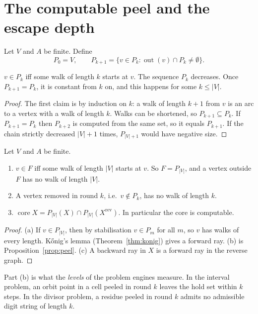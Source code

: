 \section{The computable peel and the escape depth}

Let \(V\) and \(A\) be finite. Define
\[
  P_0=V,\qquad P_{k+1}=\{v\in P_k : \operatorname{out}(v)\cap P_k\neq\emptyset\}.
\]

\begin{proposition}\label{prop:peel}
\(v\in P_k\) iff some walk of length \(k\) starts at \(v\). The sequence \(P_k\) decreases.
Once \(P_{k+1}=P_k\), it is constant from \(k\) on, and this happens for some \(k\le|V|\).
\end{proposition}

\begin{proof}
The first claim is by induction on \(k\): a walk of length \(k+1\) from \(v\) is an arc to a
vertex with a walk of length \(k\). Walks can be shortened, so \(P_{k+1}\subseteq P_k\). If
\(P_{k+1}=P_k\) then \(P_{k+2}\) is computed from the same set, so it equals \(P_{k+1}\). If the
chain strictly decreased \(|V|+1\) times, \(P_{|V|+1}\) would have negative size.
\end{proof}

\begin{theorem}\label{thm:escape}
Let \(V\) and \(A\) be finite.
\begin{enumerate}[label=(\alph*)]
\item \(v\in F\) iff some walk of length \(|V|\) starts at \(v\). So \(F=P_{|V|}\), and a vertex
  outside \(F\) has no walk of length \(|V|\).
\item A vertex removed in round \(k\), i.e.\ \(v\notin P_k\), has no walk of length \(k\).
\item \(\operatorname{core}X=P_{|V|}(X)\cap P_{|V|}(X^{\mathrm{rev}})\). In particular the core
  is computable.
\end{enumerate}
\end{theorem}

\begin{proof}
(a) If \(v\in P_{|V|}\), then by stabilisation \(v\in P_m\) for all \(m\), so \(v\) has walks
of every length. Kőnig's lemma (Theorem~\ref{thm:konig}) gives a forward ray. (b) is
Proposition~\ref{prop:peel}. (c) A backward ray in \(X\) is a forward ray in the reverse
graph.
\end{proof}

Part (b) is what the \emph{levels} of the problem engines measure. In the interval problem,
an orbit point in a cell peeled in round \(k\) leaves the hold set within \(k\) steps. In the
divisor problem, a residue peeled in round \(k\) admits no admissible digit string of length
\(k\).

